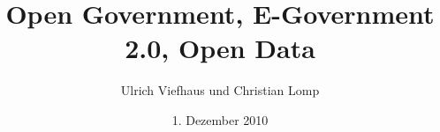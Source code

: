 \documentclass[compass]{beamer}
\title{Open Government, E-Government 2.0, Open Data}
\author{Ulrich Viefhaus und Christian Lomp}
\institute{Seminar 1916 E-Government}
\date{1. Dezember 2010}
\begin{document}
\frame{\titlepage}




\end{document}
